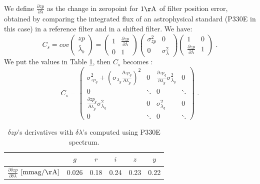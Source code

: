 \documentclass[\docopts]{\docclass}
\begin{document}
We define $\frac{\partial zp}{\partial \lambda}$ as the change in zeropoint for $1 \mathrm{\AA}$ of filter position error, obtained by comparing the integrated flux of an astrophysical standard (P330E in this case) in a reference filter and in a shifted filter.
We have:
\begin{equation}
C_s = cov
\begin{pmatrix}
  zp \\
  \bar\lambda_b 
\end{pmatrix}
=
\begin{pmatrix}
  1 & \frac{\partial zp}{\partial \lambda} \\
  0 & 1
\end{pmatrix}
\begin{pmatrix}
  \sigma_{zp}^2 & 0 \\
  0 & \sigma_{\lambda}^2
\end{pmatrix}
\begin{pmatrix}
  1 & 0 \\
  \frac{\partial zp}{\partial \lambda} & 1
\end{pmatrix}\text{ .}
\end{equation}
We put the values in Table \ref{tab::calib_derivatives}, then $C_s$ becomes :
\begin{equation}
\label{eq::cov_calib}
C_s = 
\left( \begin{array}{cc|cc} \sigma^2_{ zp_{g}} + (\sigma_{\lambda_g} \frac{\partial zp_g}{\partial \lambda_g})^2 & 0 & \frac{\partial zp_g}{\partial \lambda_g} \sigma^2_{ \lambda_g} & 0 \\ 0 & \ddots & 0 & \ddots \\ \hline \frac{\partial zp_g}{\partial \lambda_g} \sigma^2_{ \lambda_g} & 0 & \sigma^2_{\lambda_{g}} & 0 \\ 0 & \ddots & 0 & \ddots \end{array} \right) \text{ .}
\end{equation}

\begin{table}[t]
\begin{center}
\caption{$\delta zp$'s derivatives with $\delta\lambda$'s computed using P330E spectrum.}
\label{tab::calib_derivatives}
\begin{tabular}{l|ccccc}
\hline
\hline
  & $g$ & $r$ & $i$ & $z$ & $y$ \\
\hline 
  $\frac{\partial\delta zp}{\partial\delta \lambda}$ $[\mathrm{mmag/\AA}]$& 0.026 & 0.18 & 0.24 & 0.23 & 0.22\\
\hline
\end{tabular}
\end{center}
\end{table}
\end{document}

